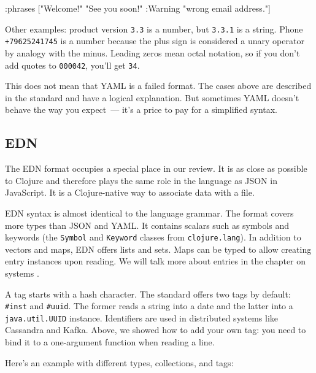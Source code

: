 \else

\begin{clojure}
{:phrases ["Welcome!"
           "See you soon!"
           {:Warning "wrong email address."}]}
\end{clojure}

\fi

Other examples: product version \verb|3.3| is a number, but \verb|3.3.1| is a string. Phone \texttt{+79625241745} is a number because the plus sign is considered a unary operator by analogy with the minus. Leading zeros mean octal notation, so if you don't add quotes to \verb|000042|, you'll get \verb|34|.

This does not mean that YAML is a failed format. The cases above are described in the standard and have a logical explanation. But sometimes YAML doesn't behave the way you expect~--- it’s a price to pay for a simplified syntax.

\subsection{EDN}


The EDN format occupies a special place in our review. It is as close as possible to Clojure and therefore plays the same role in the language as JSON in JavaScript. It is a Clojure-native way to associate data with a file.

EDN syntax is almost identical to the language grammar. The format covers more types than JSON and YAML. It contains scalars such as symbols and keywords (the \verb|Symbol| and \verb|Keyword| classes from \verb|clojure.lang|). In addition to vectors and maps, EDN offers lists and sets. Maps can be typed to allow creating entry instances upon reading. We will talk more about entries in the chapter on systems .


A tag starts with a hash character. The standard offers two tags by default: \verb|#inst| and \verb|#uuid|. The former reads a string into a date and the latter into a \verb|java.util.UUID| instance. Identifiers are used in distributed systems like Cassandra and Kafka. Above, we showed how to add your own tag: you need to bind it to a one-argument function when reading a line.

Here's an example with different types, collections, and tags:

\ifx\DEVICETYPE\MOBILE

